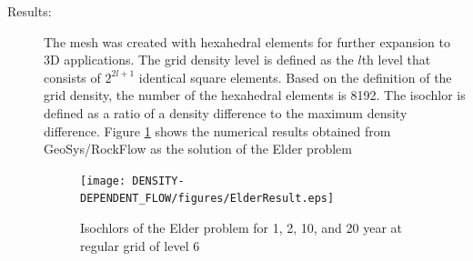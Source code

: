 \begin{description}
\item[Results:] The mesh was created with hexahedral elements for further expansion to 3D applications. The grid density level is defined as the $l$th level that consists of $2^{2l+1}$ identical square elements. Based on the definition of the grid density, the number of the hexahedral elements is 8192. The isochlor is defined as a ratio of a density difference to the maximum density difference. Figure \ref{ElderResult} shows the numerical results obtained from GeoSys/RockFlow as the solution of the Elder problem

\begin{figure}[h]
\centering
\texttt{[image: DENSITY-DEPENDENT\_FLOW/figures/ElderResult.eps]}
\caption{Isochlors of the Elder problem for 1, 2, 10, and 20 year at
regular grid of level 6} \label{ElderResult}
\end{figure}


\end{description}
